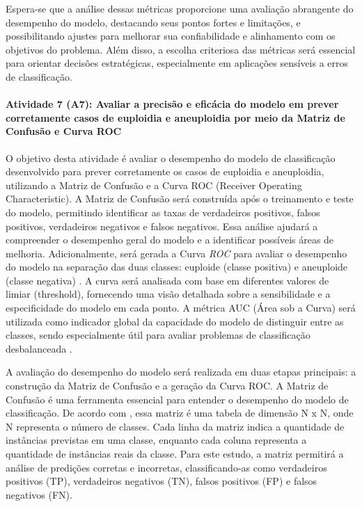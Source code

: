 Espera-se que a análise dessas métricas proporcione uma avaliação abrangente do desempenho do modelo, destacando seus pontos fortes e limitações, e possibilitando ajustes para melhorar sua confiabilidade e alinhamento com os objetivos do problema. Além disso, a escolha criteriosa das métricas será essencial para orientar decisões estratégicas, especialmente em aplicações sensíveis a erros de classificação.

\paragraph{\textbf{Atividade 7 (A7):} Avaliar a precisão e eficácia do modelo em prever corretamente casos de euploidia e aneuploidia  por meio da Matriz de Confusão e Curva ROC}

O objetivo desta atividade é avaliar o desempenho do modelo de classificação desenvolvido para prever corretamente os casos de euploidia e aneuploidia, utilizando a Matriz de Confusão e a Curva ROC (Receiver Operating Characteristic). A Matriz de Confusão será construída após o treinamento e teste do modelo, permitindo identificar as taxas de verdadeiros positivos, falsos positivos, verdadeiros negativos e falsos negativos. Essa análise ajudará a compreender o desempenho geral do modelo e a identificar possíveis áreas de melhoria. Adicionalmente, será gerada a Curva \textit{ROC} para avaliar o desempenho do modelo na separação das duas classes: euploide (classe positiva) e aneuploide (classe negativa) \cite{vilela2022}. A curva será analisada com base em diferentes valores de limiar (threshold), fornecendo uma visão detalhada sobre a sensibilidade e a especificidade do modelo em cada ponto. A métrica AUC (Área sob a Curva) será utilizada como indicador global da capacidade do modelo de distinguir entre as classes, sendo especialmente útil para avaliar problemas de classificação desbalanceada \cite{vilela2022}.

A avaliação do desempenho do modelo será realizada em duas etapas principais: a construção da Matriz de Confusão e a geração da Curva ROC. A Matriz de Confusão é uma ferramenta essencial para entender o desempenho do modelo de classificação. De acordo com , essa matriz é uma tabela de dimensão N x N, onde N representa o número de classes. Cada linha da matriz indica a quantidade de instâncias previstas em uma classe, enquanto cada coluna representa a quantidade de instâncias reais da classe. Para este estudo, a matriz permitirá a análise de predições corretas e incorretas, classificando-as como verdadeiros positivos (TP), verdadeiros negativos (TN), falsos positivos (FP) e falsos negativos (FN). 

